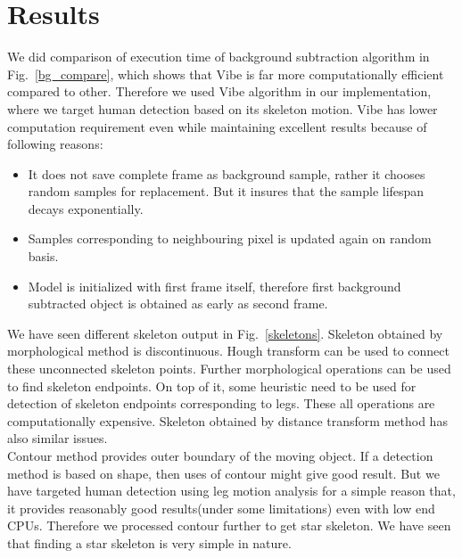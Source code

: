 \section{Results}
\indent We did comparison of execution time of background subtraction
algorithm in Fig.~\ref{bg_compare}, which shows that Vibe is far more
computationally efficient compared to other. Therefore we used Vibe
algorithm in our implementation, where we target human detection based
on its skeleton motion. Vibe has lower computation requirement even
while maintaining excellent results because of following reasons:
\begin{itemize}
 \item It does not save complete frame as background sample,
 rather it chooses random samples for replacement. But it
 insures that the sample lifespan decays exponentially.
 \item Samples corresponding to neighbouring pixel is updated
 again on random basis.
 \item Model is initialized with first frame itself, therefore first
 background subtracted object is obtained as early as
 second frame.
\end{itemize}
\indent We have seen different skeleton output in Fig.~\ref{skeletons}.
Skeleton obtained by morphological method is discontinuous. Hough
transform can be used to connect these unconnected skeleton points.
Further morphological operations can be used to find skeleton endpoints.
On top of it, some heuristic need to be used for detection of skeleton
endpoints corresponding to legs. These all operations are
computationally expensive. Skeleton obtained by distance transform
method has also similar issues.\\
\indent Contour method provides outer boundary of the moving object. If
a detection method is based on shape, then uses of contour might give
good result. But we have targeted human detection using leg motion
analysis for a simple reason that, it provides reasonably good
results(under some limitations) even with low end CPUs. Therefore we
processed contour further to get star skeleton. We have seen that
finding a star skeleton is very simple in nature.
